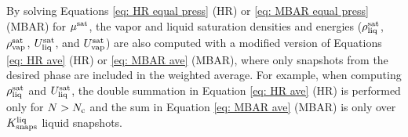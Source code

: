 \documentclass[journal=jced,manuscript=article]{achemso}
\begin{document}
By solving Equations \ref{eq: HR equal press} (HR) or \ref{eq: MBAR equal press} (MBAR) for $\mu^{\rm sat}$, the vapor and liquid saturation densities and energies ($\rho_{\rm liq}^{\rm sat}$, $\rho_{\rm vap}^{\rm sat}$, $U_{\rm liq}^{\rm sat}$, and $U_{\rm vap}^{\rm sat}$) are also computed with a modified version of Equations \ref{eq: HR ave} (HR) or \ref{eq: MBAR ave} (MBAR), where only snapshots from the desired phase are included in the weighted average. For example, when computing $\rho_{\rm liq}^{\rm sat}$ and $U_{\rm liq}^{\rm sat}$, the double summation in Equation \ref{eq: HR ave} (HR) is performed only for $N > N_{\rm c}$ and the sum in Equation \ref{eq: MBAR ave} (MBAR) is only over $K^{\rm liq}_{\rm snaps}$ liquid snapshots.

%
\end{document}
